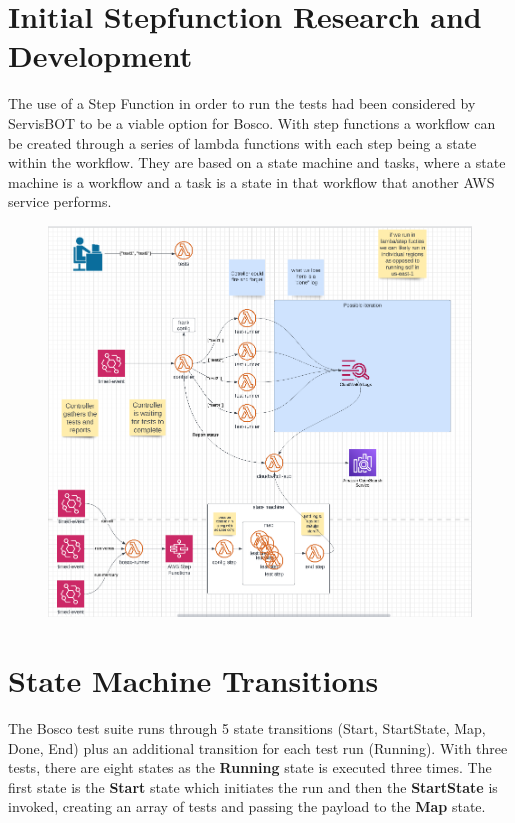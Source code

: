 \documentclass[12pt,a4paper,titlepage]{report}
\begin{document}
\section{Initial Stepfunction Research and Development}

The use of a Step Function in order to run the tests had been considered by ServisBOT to be a viable option for Bosco. With 
step functions a workflow can be created through a series of lambda functions with each step being a state within
the workflow. They are based on a state machine and tasks, where a state machine is a workflow and a task is a
state in that workflow that another AWS service performs.

\begin{figure}[H]
 \centering
 \includegraphics[width=15cm]{./diagrams/possible_implementation}
\end{figure}

\section{State Machine Transitions}

The Bosco test suite runs through 5 state transitions (Start, StartState, Map, Done, End) plus an additional transition for each test run (Running). With three tests, there are eight states as the \textbf{Running} state is executed three times. The first state is the \textbf{Start} state which initiates the run and then the \textbf{StartState} is invoked, creating an array of tests and passing the payload to the \textbf{Map} state.
\end{document}
